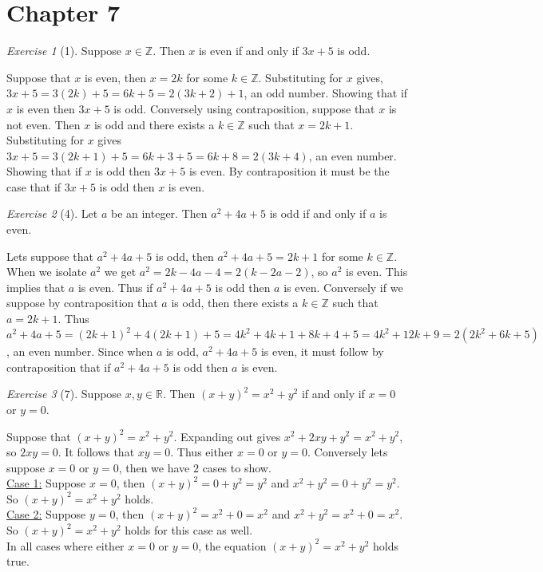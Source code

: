 \documentclass[12pt]{amsart}
\makeatletter
\theoremstyle{remark}
\newtheorem*{exercise}{Exercise}%
\def\RR{\ensuremath{\mathbb R}}
\def\ZZ{\ensuremath{\mathbb Z}}
\renewenvironment{proof}[1][\proofname]{\par\doublespacing
  \pushQED{\qed}%
  \normalfont \topsep6\p@\@plus6\p@\relax
  \list{}{%
    \settowidth{\leftmargin}{\itshape\proofname:\hskip\labelsep}%
    \setlength{\labelwidth}{0pt}%
    \setlength{\itemindent}{-\leftmargin}%
  }%
  \item[\hskip\labelsep\itshape#1\@addpunct{:}]\ignorespaces
}{%
  \popQED\endlist\@endpefalse
  \singlespacing
}
\theoremstyle{mycomment}
\makeatother
\begin{document}
\section*{Chapter 7}
\begin{exercise}[1] Suppose $x\in\ZZ$. Then $x$ is even if and only if $3x+5$ is odd.
\begin{proof}
Suppose that $x$ is even, then $x = 2k$ for some $k\in\ZZ$. Substituting for $x$ gives, $3x + 5 = 3(2k) + 5 = 6k + 5 = 2(3k + 2) + 1$, an odd number. Showing that if $x$ is even then $3x + 5$ is odd. Conversely using contraposition, suppose that $x$ is not even. Then $x$ is odd and there exists a $k\in\ZZ$ such that $x=2k+1$. Substituting for $x$ gives $3x + 5 = 3(2k+1) + 5 = 6k+ 3 + 5 = 6k + 8 = 2(3k+4)$, an even number. Showing that if $x$ is odd then $3x+5$ is even. By contraposition it must be the case that if $3x+5$ is odd then $x$ is even.
\end{proof}
\end{exercise}
\begin{exercise}[4] Let $a$ be an integer. Then $a^{2}+4a+5$ is odd if and only if $a$ is even.
\begin{proof}
Lets suppose that $a^2 + 4a + 5$ is odd, then $a^2 + 4a + 5 = 2k+1$ for some $k\in\ZZ$. When we isolate $a^2$ we get $a^2 = 2k - 4a - 4 = 2(k-2a-2)$, so $a^2$ is even. This implies that $a$ is even. Thus if $a^2 + 4a + 5$ is odd then $a$ is even. Conversely if we suppose by contraposition that $a$ is odd, then there exists a $k\in\ZZ$ such that $a = 2k+1$. Thus $a^2 +4a + 5 = (2k+1)^2 + 4(2k+1) + 5 = 4k^2 + 4k + 1 + 8k + 4 + 5 = 4k^2 + 12k + 9 = 2(2k^2 + 6k + 5)$, an even number. Since when $a$ is odd, $a^2 + 4a + 5$ is even, it must follow by contraposition that if $a^2 + 4a + 5$ is odd then $a$ is even. \end{proof}
\end{exercise}
\begin{exercise}[7] Suppose $x,y\in\RR$. Then $(x+y)^{2}=x^{2}+y^{2}$ if and only if $x=0$ or $y=0$.
\begin{proof}
Suppose that $(x+y)^2 = x^2 + y^2$. Expanding out gives $x^2 + 2xy + y^2 = x^2 + y^2$, so $2xy = 0$. It follows that $xy = 0$. Thus either $x=0$ or $y= 0$. Conversely lets suppose $x=0$ or $y=0$, then we have $2$ cases to show. \\
\underline{Case 1:} Suppose $x = 0$, then $(x+y)^2 = 0 + y^2 = y^2$ and $x^2 + y^2 =  0 + y^2 = y^2$. So $(x+y)^2 = x^2 + y^2$ holds. \\
\underline{Case 2:} Suppose $y = 0$, then $(x+y)^2 = x^2 + 0 = x^2$ and $x^2 + y^2 = x^2 + 0 = x^2$. So $(x+y)^2 = x^2 + y^2$ holds for this case as well.\\
In all cases where either $x = 0$ or $y = 0$, the equation $(x+y)^2 = x^2 + y^2$ holds true.
\end{proof}
\end{exercise}
\end{document}
